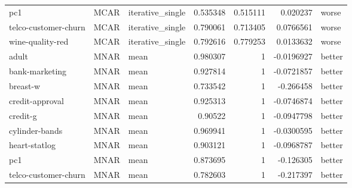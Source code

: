 \begin{table}[ht]
\begin{tabular}{lllrrrl}
 pc1                  & MCAR        & iterative\_single &                                 0.535348 &                             0.515111 &                     0.020237   & worse                \\
 telco-customer-churn & MCAR        & iterative\_single &                                 0.790061 &                             0.713405 &                     0.0766561  & worse                \\
 wine-quality-red     & MCAR        & iterative\_single &                                 0.792616 &                             0.779253 &                     0.0133632  & worse                \\
 adult                & MNAR        & mean             &                                 0.980307 &                             1        &                    -0.0196927  & better               \\
 bank-marketing       & MNAR        & mean             &                                 0.927814 &                             1        &                    -0.0721857  & better               \\
 breast-w             & MNAR        & mean             &                                 0.733542 &                             1        &                    -0.266458   & better               \\
 credit-approval      & MNAR        & mean             &                                 0.925313 &                             1        &                    -0.0746874  & better               \\
 credit-g             & MNAR        & mean             &                                 0.90522  &                             1        &                    -0.0947798  & better               \\
 cylinder-bands       & MNAR        & mean             &                                 0.969941 &                             1        &                    -0.0300595  & better               \\
 heart-statlog        & MNAR        & mean             &                                 0.903121 &                             1        &                    -0.0968787  & better               \\
 pc1                  & MNAR        & mean             &                                 0.873695 &                             1        &                    -0.126305   & better               \\
 telco-customer-churn & MNAR        & mean             &                                 0.782603 &                             1        &                    -0.217397   & better               \\

\end{tabular}
\end{table}
